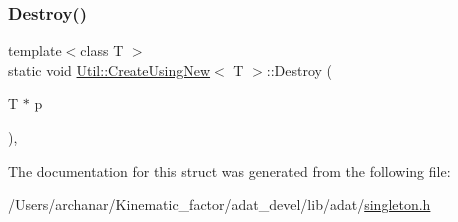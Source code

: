 \subsubsection{\texorpdfstring{Destroy()}{Destroy()}\hspace{0.1cm}{\footnotesize\ttfamily [2/2]}}
{\footnotesize\ttfamily template$<$class T $>$ \\
static void \mbox{\hyperlink{structUtil_1_1CreateUsingNew}{Util\+::\+Create\+Using\+New}}$<$ T $>$\+::Destroy (\begin{DoxyParamCaption}\item[{T $\ast$}]{p }\end{DoxyParamCaption})\hspace{0.3cm}{\ttfamily [inline]}, {\ttfamily [static]}}



The documentation for this struct was generated from the following file\+:\begin{DoxyCompactItemize}
\item 
/\+Users/archanar/\+Kinematic\+\_\+factor/adat\+\_\+devel/lib/adat/\mbox{\hyperlink{lib_2adat_2singleton_8h}{singleton.\+h}}\end{DoxyCompactItemize}
